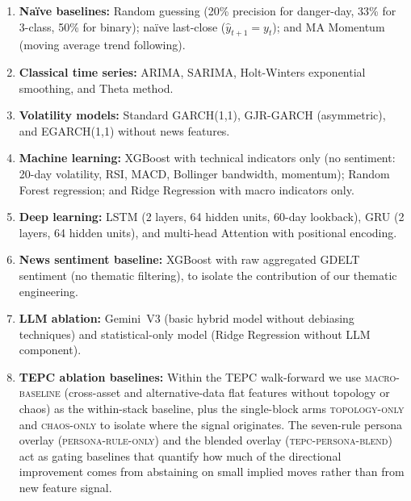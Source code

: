 \documentclass[11pt]{article}
\begin{document}
\begin{sloppypar}
\begin{enumerate}[leftmargin=*]
    \item \textbf{Na\"ive baselines:} Random guessing (20\% precision for danger-day, 33\% for 3-class, 50\% for binary); na\"ive last-close ($\hat{y}_{t+1} = y_t$); and MA Momentum (moving average trend following).
    
    \item \textbf{Classical time series:} ARIMA, SARIMA, Holt-Winters exponential smoothing, and Theta method.
    
    \item \textbf{Volatility models:} Standard GARCH(1,1), GJR-GARCH (asymmetric), and EGARCH(1,1) without news features.
    
    \item \textbf{Machine learning:} XGBoost with technical indicators only (no sentiment: 20-day volatility, RSI, MACD, Bollinger bandwidth, momentum); Random Forest regression; and Ridge Regression with macro indicators only.
    
    \item \textbf{Deep learning:} LSTM (2 layers, 64 hidden units, 60-day lookback), GRU (2 layers, 64 hidden units), and multi-head Attention with positional encoding.
    
    \item \textbf{News sentiment baseline:} XGBoost with raw aggregated GDELT sentiment (no thematic filtering), to isolate the contribution of our thematic engineering.
    
    \item \textbf{LLM ablation:} Gemini~V3 (basic hybrid model without debiasing techniques) and statistical-only model (Ridge Regression without LLM component).

    \item \textbf{TEPC ablation baselines:} Within the TEPC walk-forward we use \textsc{macro-baseline} (cross-asset and alternative-data flat features without topology or chaos) as the within-stack baseline, plus the single-block arms \textsc{topology-only} and \textsc{chaos-only} to isolate where the signal originates. The seven-rule persona overlay (\textsc{persona-rule-only}) and the blended overlay (\textsc{tepc-persona-blend}) act as gating baselines that quantify how much of the directional improvement comes from abstaining on small implied moves rather than from new feature signal.


\end{enumerate}
\end{sloppypar}
\end{document}
